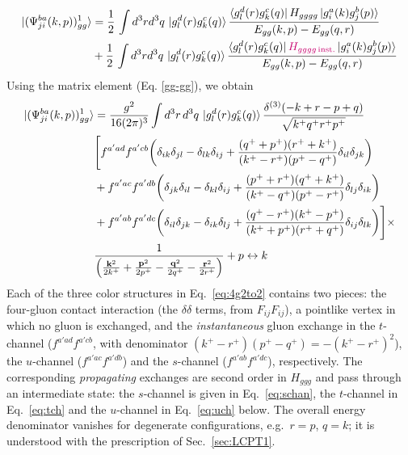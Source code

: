 \documentclass[a4paper,11pt]{article}
\def\v#1{\mathbf{#1}}
\begin{document}
\begin{figure}[htbp]
    \centering
\end{figure}
\begin{align}
     \ket{(\Psi^{ba}_{ji}(k,p))^{1}_{gg}} &  = \frac{1}{2}\,\int d^{3}r d^{3}q\, \ket{g^{d}_{l}(r)g^{c}_{k}(q)}\frac{\bra{g^{d}_{l}(r)g^{c}_{k}(q)}H_{gggg}\ket{g^{a}_{i}(k)g^{b}_{j}(p)}}{E_{gg}(k,p)-E_{gg}(q,r)} \notag \\ & + \frac{1}{2}\,\int d^{3}r d^{3}q\, \ket{g^{d}_{l}(r)g^{c}_{k}(q)}\frac{\bra{g^{d}_{l}(r)g^{c}_{k}(q)}{\color{chg}H_{gggg\,\text{inst.}}}\ket{g^{a}_{i}(k)g^{b}_{j}(p)}}{E_{gg}(k,p)-E_{gg}(q,r)}
\end{align}
Using the matrix element (Eq. \eqref{gg-gg}), we obtain
\begin{align}\label{eq:4g2to2}
 \ket{(\Psi^{ba}_{ji}(k,p))^{1}_{gg}}& =    \frac{g^{2}}{16(2\pi)^{3}}\int d^{3}r\, d^{3}q\, \ket{g^{d}_{l}(r)g^{c}_{k}(q)}\frac{\delta^{(3)}(-k+r-p+q)}{\sqrt{k^{+}q^{+}r^{+}p^{+}}}\notag \\ & \Bigg[f^{a'ad}f^{a'cb}\bigg(\delta_{ik}\delta_{jl}-\delta_{lk}\delta_{ij}+\frac{(q^{+}+p^{+})(r^{+}+k^{+})}{(k^{+}-r^{+})(p^{+}-q^{+})}\delta_{il}\delta_{jk}\bigg)\notag \\ & +f^{a'ac}f^{a'db}\bigg(\delta_{jk}\delta_{il}-\delta_{kl}\delta_{ij}+\frac{(p^{+}+r^{+})(q^{+}+k^{+})}{(k^{+}-q^{+})(p^{+}-r^{+})}\delta_{lj}\delta_{ik}\bigg)\notag \\ & + f^{a'ab}f^{a'dc}\bigg(\delta_{il}\delta_{jk}-\delta_{ik}\delta_{lj}+\frac{(q^{+}-r^{+})(k^{+}-p^{+})}{(k^{+}+p^{+})(r^{+}+q^{+})}\delta_{ij}\delta_{lk}\bigg) \Bigg]\times \notag \\ & \frac{1}{\left(\frac{\v{k}^{2}}{2k^{+}}+\frac{\v{p}^{2}}{2p^{+}}-\frac{\v{q}^{2}}{2q^{+}}-\frac{\v{r}^{2}}{2r^{+}}\right)} + p\leftrightarrow k 
\end{align}
{\color{chg}Each of the three color structures in Eq.~\eqref{eq:4g2to2} contains two pieces: the four-gluon contact interaction (the $\delta\delta$ terms, from $F_{ij}F_{ij}$), a pointlike vertex in which no gluon is exchanged, and the \emph{instantaneous} gluon exchange in the $t$-channel ($f^{a'ad}f^{a'cb}$, with denominator $(k^{+}-r^{+})(p^{+}-q^{+})=-(k^{+}-r^{+})^{2}$), the $u$-channel ($f^{a'ac}f^{a'db}$) and the $s$-channel ($f^{a'ab}f^{a'dc}$), respectively. The corresponding \emph{propagating} exchanges are second order in $H_{ggg}$ and pass through an intermediate state: the $s$-channel is given in Eq.~\eqref{eq:schan}, the $t$-channel in Eq.~\eqref{eq:tch} and the $u$-channel in Eq.~\eqref{eq:uch} below. The overall energy denominator vanishes for degenerate configurations, e.g.\ $r=p$, $q=k$; it is understood with the prescription of Sec.~\ref{sec:LCPT1}.}
\end{document}
